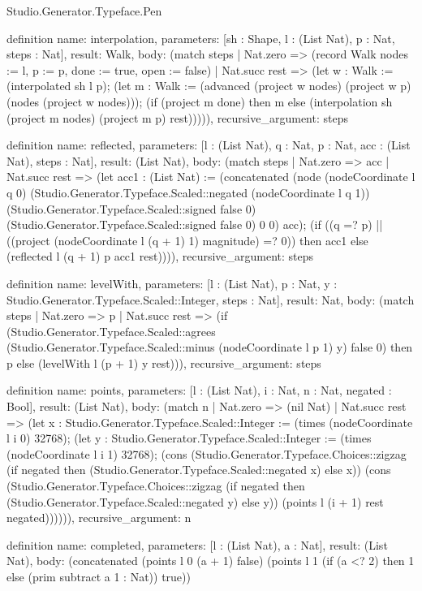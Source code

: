 \begin{lexlean}{Studio.Generator.Typeface.Pen}
\begin{semanticmodule}
definition{
  name: interpolation,
  parameters: [sh : Shape, l : (List Nat), p : Nat, steps : Nat],
  result: Walk,
  body: (match steps
    | Nat.zero => (record Walk {nodes := l, p := p, done := true, open := false})
    | Nat.succ rest => (let w : Walk := (interpolated sh l p); (let m : Walk := (advanced (project w nodes) (project w p) (nodes (project w nodes))); (if (project m done) then m else (interpolation sh (project m nodes) (project m p) rest))))),
  recursive_argument: steps
}

definition{
  name: reflected,
  parameters: [l : (List Nat), q : Nat, p : Nat, acc : (List Nat), steps : Nat],
  result: (List Nat),
  body: (match steps
    | Nat.zero => acc
    | Nat.succ rest => (let acc1 : (List Nat) := (concatenated (node (nodeCoordinate l q 0) (Studio.Generator.Typeface.Scaled::negated (nodeCoordinate l q 1)) (Studio.Generator.Typeface.Scaled::signed false 0) (Studio.Generator.Typeface.Scaled::signed false 0) 0 0) acc); (if ((q =? p) || ((project (nodeCoordinate l (q + 1) 1) magnitude) =? 0)) then acc1 else (reflected l (q + 1) p acc1 rest)))),
  recursive_argument: steps
}

definition{
  name: levelWith,
  parameters: [l : (List Nat), p : Nat, y : Studio.Generator.Typeface.Scaled::Integer, steps : Nat],
  result: Nat,
  body: (match steps
    | Nat.zero => p
    | Nat.succ rest => (if (Studio.Generator.Typeface.Scaled::agrees (Studio.Generator.Typeface.Scaled::minus (nodeCoordinate l p 1) y) false 0) then p else (levelWith l (p + 1) y rest))),
  recursive_argument: steps
}

definition{
  name: points,
  parameters: [l : (List Nat), i : Nat, n : Nat, negated : Bool],
  result: (List Nat),
  body: (match n
    | Nat.zero => (nil Nat)
    | Nat.succ rest => (let x : Studio.Generator.Typeface.Scaled::Integer := (times (nodeCoordinate l i 0) 32768); (let y : Studio.Generator.Typeface.Scaled::Integer := (times (nodeCoordinate l i 1) 32768); (cons (Studio.Generator.Typeface.Choices::zigzag (if negated then (Studio.Generator.Typeface.Scaled::negated x) else x)) (cons (Studio.Generator.Typeface.Choices::zigzag (if negated then (Studio.Generator.Typeface.Scaled::negated y) else y)) (points l (i + 1) rest negated)))))),
  recursive_argument: n
}

definition{
  name: completed,
  parameters: [l : (List Nat), a : Nat],
  result: (List Nat),
  body: (concatenated (points l 0 (a + 1) false) (points l 1 (if (a <? 2) then 1 else (prim subtract a 1 : Nat)) true))
}


\end{semanticmodule}
\end{lexlean}
